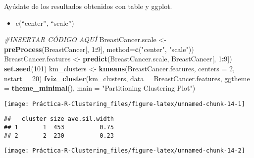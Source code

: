 \documentclass[
]{article}
\newenvironment{Shaded}{\begin{snugshade}}{\end{snugshade}}
\newcommand{\CommentTok}[1]{\textcolor[rgb]{0.56,0.35,0.01}{\textit{#1}}}
\newcommand{\DataTypeTok}[1]{\textcolor[rgb]{0.13,0.29,0.53}{#1}}
\newcommand{\DecValTok}[1]{\textcolor[rgb]{0.00,0.00,0.81}{#1}}
\newcommand{\KeywordTok}[1]{\textcolor[rgb]{0.13,0.29,0.53}{\textbf{#1}}}
\newcommand{\NormalTok}[1]{#1}
\newcommand{\OperatorTok}[1]{\textcolor[rgb]{0.81,0.36,0.00}{\textbf{#1}}}
\newcommand{\StringTok}[1]{\textcolor[rgb]{0.31,0.60,0.02}{#1}}
\providecommand{\tightlist}{%
  \setlength{\itemsep}{0pt}\setlength{\parskip}{0pt}}
\begin{document}
Ayúdate de los resultados obtenidos con table y ggplot.

\begin{itemize}
\tightlist
\item
  c(``center'', ``scale'')
\end{itemize}

\begin{Shaded}
\begin{Highlighting}[]
\CommentTok{#INSERTAR CÓDIGO AQUÍ}
\NormalTok{BreastCancer.scale <-}\StringTok{ }\KeywordTok{preProcess}\NormalTok{(BreastCancer[, }\DecValTok{1}\OperatorTok{:}\DecValTok{9}\NormalTok{], }\DataTypeTok{method=}\KeywordTok{c}\NormalTok{(}\StringTok{"center"}\NormalTok{, }\StringTok{"scale"}\NormalTok{))}
\NormalTok{BreastCancer.features <-}\StringTok{ }\KeywordTok{predict}\NormalTok{(BreastCancer.scale, BreastCancer[, }\DecValTok{1}\OperatorTok{:}\DecValTok{9}\NormalTok{])}
\KeywordTok{set.seed}\NormalTok{(}\DecValTok{101}\NormalTok{)}
\NormalTok{km_clusters <-}\StringTok{ }\KeywordTok{kmeans}\NormalTok{(BreastCancer.features, }\DataTypeTok{centers =} \DecValTok{2}\NormalTok{, }\DataTypeTok{nstart =} \DecValTok{20}\NormalTok{)}
\KeywordTok{fviz_cluster}\NormalTok{(km_clusters, }\DataTypeTok{data =}\NormalTok{ BreastCancer.features,}
             \DataTypeTok{ggtheme =} \KeywordTok{theme_minimal}\NormalTok{(),}
             \DataTypeTok{main =} \StringTok{"Partitioning Clustering Plot"}\NormalTok{)}
\end{Highlighting}
\end{Shaded}

\begin{center}\texttt{[image: Práctica-R-Clustering\_files/figure-latex/unnamed-chunk-14-1]} \end{center}

\begin{Shaded}
\end{Shaded}

\begin{verbatim}
##   cluster size ave.sil.width
## 1       1  453          0.75
## 2       2  230          0.23
\end{verbatim}

\begin{center}\texttt{[image: Práctica-R-Clustering\_files/figure-latex/unnamed-chunk-14-2]} \end{center}
\end{document}
